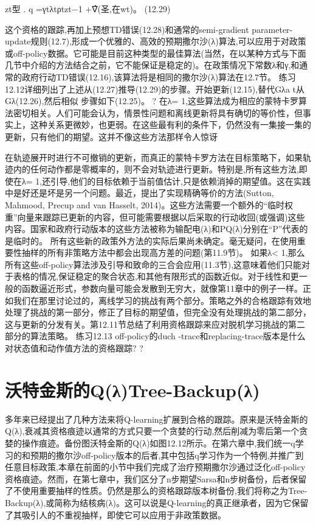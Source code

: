 zt型
.
q =γtλtρtzt−1 +∇̂(圣,在wt)。 					(12.29)

这个资格的跟踪,再加上预想TD错误(12.28)和通常的semi-gradient parameter-update规则(12.7),形成一个优雅的、高效的预期撒尔沙(λ)算法,可以应用于对政策或off-policy数据。它可能是目前这种类型的最佳算法(当然，在以某种方式与下面几节中介绍的方法结合之前，它不能保证是稳定的)。在政策情况下常数λ和γ,和通常的政府行动TD错误(12.16),该算法将是相同的撒尔沙(λ)算法在12.7节。
练习12.12详细列出了上述从(12.27)推导(12.29)的步骤。开始更新(12.15),替代Gλa t从Gλ(12.26),然后相似
步骤如下(12.25)。 					?
在λ= 1,这些算法成为相应的蒙特卡罗算法密切相关。人们可能会认为，情景性问题和离线更新将具有确切的等价性，但事实上，这种关系更微妙，也更弱。在这些最有利的条件下，仍然没有一集接一集的更新，只有他们的期望。这并不像这些方法那样令人惊讶

在轨迹展开时进行不可撤销的更新，而真正的蒙特卡罗方法在目标策略下，如果轨迹内的任何动作都是零概率的，则不会对轨迹进行更新。特别是,所有这些方法,即使在λ= 1,还引导,他们的目标依赖于当前值估计,只是依赖消掉的期望值。这在实践中是好还是坏是另一个问题。最近，提出了实现精确等价的方法(Sutton, Mahmood, Precup and van Hasselt, 2014)。这些方法需要一个额外的“临时权重”向量来跟踪已更新的内容，但可能需要根据以后采取的行动收回(或强调)这些内容。国家和政府行动版本的这些方法被称为输配电(λ)和PQ(λ)分别在“P”代表的是临时的。
所有这些新的政策外方法的实际后果尚未确定。毫无疑问，在使用重要性抽样的所有非策略方法中都会出现高方差的问题(第11.9节)。
如果λ< 1,那么所有这些off-policy算法涉及引导和致命的三合会应用(11.3节),这意味着他们只能对于表格的情况,保证稳定的聚合状态,和其他有限形式的函数近似。对于线性和更一般的函数逼近形式，参数向量可能会发散到无穷大，就像第11章中的例子一样。正如我们在那里讨论过的，离线学习的挑战有两个部分。策略之外的合格跟踪有效地处理了挑战的第一部分，修正了目标的期望值，但完全没有处理挑战的第二部分，这与更新的分发有关。第12.11节总结了利用资格跟踪来应对脱机学习挑战的第二部分的算法策略。
练习12.13 off-policy的duch -trace和replacing-trace版本是什么
对状态值和动作值方法的资格跟踪? 					?

\section{沃特金斯的Q(λ)Tree-Backup(λ)}
多年来已经提出了几种方法来将Q-learning扩展到合格的跟踪。原来是沃特金斯的Q(λ),衰减其资格痕迹以通常的方式只要一个贪婪的行动,然后削减为零后第一个贪婪的操作痕迹。备份图沃特金斯的Q(λ)如图12.12所示。在第六章中,我们统一q学习的和预期的撒尔沙off-policy版本的后者,其中包括q学习作为一个特例,并推广到任意目标政策,本章在前面的小节中我们完成了治疗预期撒尔沙通过泛化off-policy资格痕迹。然而，在第七章中，我们区分了n步期望Sarsa和n步树备份，后者保留了不使用重要抽样的性质。仍然是那么的资格跟踪版本树备份,我们将称之为Tree-Backup(λ),或简称为结核病(λ)。这可以说是Q-learning的真正继承者，因为它保留了其吸引人的不重视抽样，即使它可以应用于非政策数据。

